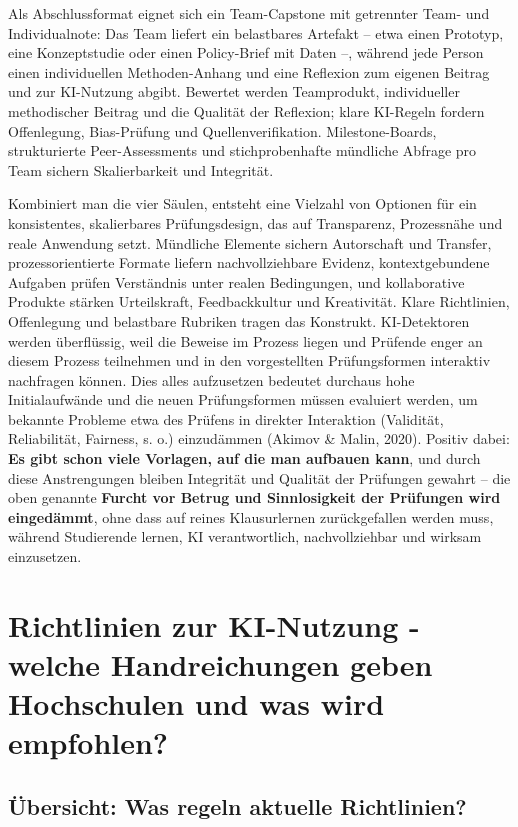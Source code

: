 \documentclass[
  ngerman,
  letterpaper,
  DIV=11]{scrreprt}
\begin{document}
Als Abschlussformat eignet sich ein Team-Capstone mit getrennter Team-
und Individualnote: Das Team liefert ein belastbares Artefakt -- etwa
einen Prototyp, eine Konzeptstudie oder einen Policy-Brief mit Daten --,
während jede Person einen individuellen Methoden-Anhang und eine
Reflexion zum eigenen Beitrag und zur KI-Nutzung abgibt. Bewertet werden
Teamprodukt, individueller methodischer Beitrag und die Qualität der
Reflexion; klare KI-Regeln fordern Offenlegung, Bias-Prüfung und
Quellenverifikation. Milestone-Boards, strukturierte Peer-Assessments
und stichprobenhafte mündliche Abfrage pro Team sichern Skalierbarkeit
und Integrität.

Kombiniert man die vier Säulen, entsteht eine Vielzahl von Optionen für
ein konsistentes, skalierbares Prüfungsdesign, das auf Transparenz,
Prozessnähe und reale Anwendung setzt. Mündliche Elemente sichern
Autorschaft und Transfer, prozessorientierte Formate liefern
nachvollziehbare Evidenz, kontextgebundene Aufgaben prüfen Verständnis
unter realen Bedingungen, und kollaborative Produkte stärken
Urteilskraft, Feedbackkultur und Kreativität. Klare Richtlinien,
Offenlegung und belastbare Rubriken tragen das Konstrukt. KI-Detektoren
werden überflüssig, weil die Beweise im Prozess liegen und Prüfende
enger an diesem Prozess teilnehmen und in den vorgestellten
Prüfungsformen interaktiv nachfragen können. Dies alles aufzusetzen
bedeutet durchaus hohe Initialaufwände und die neuen Prüfungsformen
müssen evaluiert werden, um bekannte Probleme etwa des Prüfens in
direkter Interaktion (Validität, Reliabilität, Fairness, s. o.)
einzudämmen (Akimov \& Malin, 2020). Positiv dabei: \textbf{Es gibt
schon viele Vorlagen, auf die man aufbauen kann}, und durch diese
Anstrengungen bleiben Integrität und Qualität der Prüfungen gewahrt --
die oben genannte \textbf{Furcht vor Betrug und Sinnlosigkeit der
Prüfungen wird eingedämmt}, ohne dass auf reines Klausurlernen
zurückgefallen werden muss, während Studierende lernen, KI
verantwortlich, nachvollziehbar und wirksam einzusetzen.

\section{Richtlinien zur KI-Nutzung - welche Handreichungen geben
Hochschulen und was wird
empfohlen?}\label{richtlinien-zur-ki-nutzung---welche-handreichungen-geben-hochschulen-und-was-wird-empfohlen}

\subsection{Übersicht: Was regeln aktuelle
Richtlinien?}\label{uxfcbersicht-was-regeln-aktuelle-richtlinien}
\end{document}
